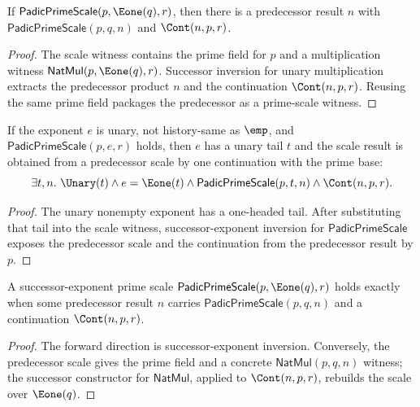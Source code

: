 \begin{lemma}
\label{lem:padic-prime-scale-succ-exponent-inversion}
If \(\mathsf{PadicPrimeScale}(p,\Eone(q),r)\), then there is a predecessor
result \(n\) with \(\mathsf{PadicPrimeScale}(p,q,n)\) and \(\Cont(n,p,r)\).
\end{lemma}
\begin{proof}
The scale witness contains the prime field for \(p\) and a multiplication
witness \(\mathsf{NatMul}(p,\Eone(q),r)\). Successor inversion for unary
multiplication extracts the predecessor product \(n\) and the continuation
\(\Cont(n,p,r)\). Reusing the same prime field packages the predecessor as a
prime-scale witness.
\end{proof}

\begin{theorem}
\label{thm:padic-prime-scale-positive-exponent-cont-readback}
If the exponent $e$ is unary, not history-same as $\emp$, and
\(\mathsf{PadicPrimeScale}(p,e,r)\) holds, then \(e\) has a unary tail \(t\)
and the scale result is obtained from a predecessor scale by one continuation
with the prime base:
$$
\exists t,n.\ \Unary(t)\land e=\Eone(t)\land
\mathsf{PadicPrimeScale}(p,t,n)\land\Cont(n,p,r).
$$
\end{theorem}
\begin{proof}
The unary nonempty exponent has a one-headed tail. After substituting that
tail into the scale witness, successor-exponent inversion for
\(\mathsf{PadicPrimeScale}\) exposes the predecessor scale and the continuation
from the predecessor result by \(p\).
\end{proof}

\begin{theorem}
\label{thm:padic-prime-scale-succ-exponent-factorization}
A successor-exponent prime scale $\mathsf{PadicPrimeScale}(p,\Eone(q),r)$
holds exactly when some predecessor result $n$ carries
$\mathsf{PadicPrimeScale}(p,q,n)$ and a continuation $\Cont(n,p,r)$.
\end{theorem}
\begin{proof}
The forward direction is successor-exponent inversion. Conversely, the
predecessor scale gives the prime field and a concrete
$\mathsf{NatMul}(p,q,n)$ witness; the successor constructor for
$\mathsf{NatMul}$, applied to $\Cont(n,p,r)$, rebuilds the scale over
$\Eone(q)$.
\end{proof}

